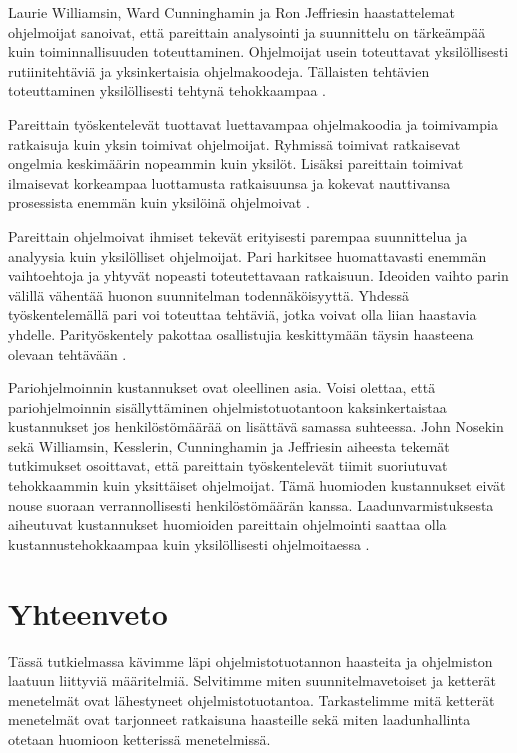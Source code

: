 \documentclass[finnish]{tktltiki2}
\theoremstyle{definition}
\theoremstyle{remark}
\begin{document}
{Laurie Williamsin, Ward Cunninghamin ja Ron Jeffriesin haastattelemat ohjelmoijat sanoivat, että pareittain analysointi ja suunnittelu on tärkeämpää kuin toiminnallisuuden toteuttaminen. Ohjelmoijat usein toteuttavat yksilöllisesti rutiinitehtäviä ja yksinkertaisia ohjelmakoodeja. Tällaisten tehtävien toteuttaminen yksilöllisesti tehtynä tehokkaampaa \cite{WIL00}.

Pareittain työskentelevät tuottavat luettavampaa ohjelmakoodia ja toimivampia ratkaisuja kuin yksin toimivat ohjelmoijat. Ryhmissä toimivat ratkaisevat ongelmia keskimäärin nopeammin kuin yksilöt. Lisäksi pareittain toimivat ilmaisevat korkeampaa luottamusta ratkaisuunsa ja kokevat nauttivansa prosessista enemmän kuin yksilöinä ohjelmoivat \cite{NOS98}.

Pareittain ohjelmoivat ihmiset tekevät erityisesti parempaa suunnittelua ja analyysia kuin yksilölliset ohjelmoijat. Pari harkitsee huomattavasti enemmän vaihtoehtoja ja yhtyvät nopeasti toteutettavaan ratkaisuun. Ideoiden vaihto parin välillä vähentää huonon suunnitelman todennäköisyyttä. Yhdessä työskentelemällä pari voi toteuttaa tehtäviä, jotka voivat olla liian haastavia yhdelle. Parityöskentely pakottaa osallistujia keskittymään täysin haasteena olevaan tehtävään \cite{WIL00}.

Pariohjelmoinnin kustannukset ovat oleellinen asia. Voisi olettaa, että pariohjelmoinnin sisällyttäminen ohjelmistotuotantoon kaksinkertaistaa kustannukset jos henkilöstömäärää on lisättävä samassa suhteessa. John Nosekin \cite{NOS98} sekä Williamsin, Kesslerin, Cunninghamin ja Jeffriesin \cite{WIL00} aiheesta tekemät tutkimukset osoittavat, että pareittain työskentelevät tiimit suoriutuvat tehokkaammin kuin yksittäiset ohjelmoijat. Tämä huomioden kustannukset eivät nouse suoraan verrannollisesti henkilöstömäärän kanssa. Laadunvarmistuksesta aiheutuvat kustannukset huomioiden pareittain ohjelmointi saattaa olla kustannustehokkaampaa kuin yksilöllisesti ohjelmoitaessa \cite{COC00a}.

\section{Yhteenveto}

Tässä tutkielmassa kävimme läpi ohjelmistotuotannon haasteita ja ohjelmiston laatuun liittyviä määritelmiä. Selvitimme miten suunnitelmavetoiset ja ketterät menetelmät ovat lähestyneet ohjelmistotuotantoa. Tarkastelimme mitä ketterät menetelmät ovat tarjonneet ratkaisuna haasteille sekä miten laadunhallinta otetaan huomioon ketterissä menetelmissä. 

}
\end{document}
